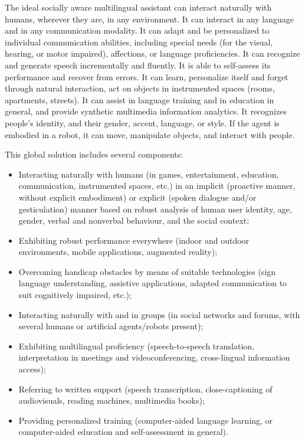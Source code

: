 \documentclass[10pt, plain]{../../metanetpaper}
\begin{document}
\begin{multicols}{2}
The ideal socially aware multilingual assistant can interact naturally with humans, wherever they are, in any environment. It can interact in any language and in any communication modality. It can adapt and be personalized to individual communication abilities, including special needs (for the visual, hearing, or motor impaired), affections, or language proficiencies. It can recognize and generate speech incrementally and fluently. It is able to self-assess its performance and recover from errors. It can learn, personalize itself and forget through natural interaction, act on objects in instrumented spaces (rooms, apartments, streets). It can assist in language training and in education in general, and provide synthetic multimedia information analytics. It recognizes people’s identity, and their gender, accent, language, or style. If the agent is embodied in a robot, it can move, manipulate objects, and interact with people.

This global solution includes several components:

\begin{itemize}
\item Interacting naturally with humans (in games, entertainment, education, communication, instrumented spaces, etc.) in an implicit (proactive manner, without explicit embodiment) or explicit (spoken dialogue and/or gesticulation) manner based on robust analysis of human user identity, age, gender, verbal and nonverbal behaviour, and the social context;
\item Exhibiting robust performance everywhere (indoor and outdoor environments, mobile applications, augmented reality);
\item Overcoming handicap obstacles by means of suitable technologies (sign language understanding, assistive applications, adapted communication to suit cognitively impaired, etc.);
\item Interacting naturally with and in groups (in social networks and forums, with several humans or artificial agents/robots present);
\item Exhibiting multilingual proficiency (speech-to-speech translation, interpretation in meetings and videoconferencing, cross-lingual information access);
\item Referring to written support (speech transcription, close-captioning of audiovisuals, reading machines, multimedia books);
\item Providing personalized training (computer-aided language learning, or computer-aided education and self-assessment in general).
\end{itemize}


\end{multicols}
\end{document}
